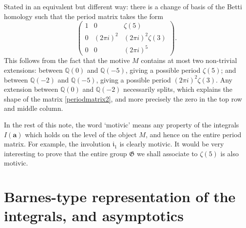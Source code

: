 \documentclass[12pt,reqno]{amsart}
\theoremstyle{remark}
\newcommand\ba{\boldsymbol a}
\newcommand\frG{\mathfrak G}
\newcommand\fri{\mathfrak i}
\begin{document}
Stated in an equivalent but different way:  there is a change of basis of the Betti homology such that the period matrix takes the form 
\begin{equation} \label{periodmatrix2}
\begin{pmatrix} 1 &  0  & \zeta(5)  \\ 
0 & (2\pi i)^2 & (2\pi i)^2 \zeta(3)  \\
0 & 0 & (2\pi i)^5
\end{pmatrix}.
\end{equation}
This follows from the fact that the  motive $M$ contains at most two non-trivial extensions:  between $\mathbb{Q}(0)$ and $\mathbb{Q}(-5)$, giving a possible period $\zeta(5)$;  and between 
$\mathbb{Q}(-2)$ and $\mathbb{Q}(-5)$, giving a possible period $(2\pi i)^2 \zeta(3)$. Any extension between $\mathbb{Q}(0)$ and $\mathbb{Q}(-2)$ necessarily splits, which explains the shape of the  matrix \eqref{periodmatrix2}, and more precisely  the zero in the top row and middle column. 

In the rest of this note, the word `motivic' means any property of  the integrals $I(\ba)$ which holds on the level of the object $M$, and hence on the entire period matrix. For example, the involution  $\fri_1$  is clearly motivic. It would be very interesting to prove that the entire group  $\frG$ we shall associate  to  $\zeta(5)$  is also motivic.

\section{Barnes-type  representation of the integrals, and asymptotics}
\label{sec4}
\end{document}
